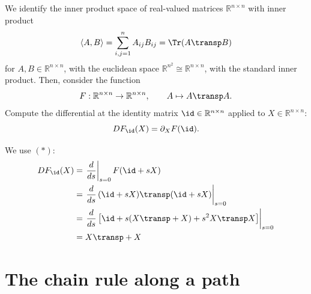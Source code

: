 \begin{center}
\end{center}

\begin{exercise}
\label{ex:transpose_diff}
We identify the inner product space of real-valued matrices $\mathbb{R}^{n\times n}$ with inner
product
\[\langle A, B\rangle = \sum_{i,j=1}^{n} A_{ij}B_{ij} = \Tr(A\transp B)\]
for $A, B \in \mathbb{R}^{n\times n}$, with the euclidean space
$\mathbb{R}^{n^2}\cong\mathbb{R}^{n\times n}$, with the standard inner product. Then, consider
the function
\[F : \mathbb{R}^{n\times n}\to\mathbb{R}^{n\times n}, \qquad A \mapsto A\transp A.\]
Compute the differential at the identity matrix $\id \in \mathbb{R}^{n\times n}$ applied to
$X \in \mathbb{R}^{n\times n}$:
\[DF_{\id}(X) = \partial_X F(\id).\]
\end{exercise}

\begin{exercisesolution}
We use $(*)$:
\[
\begin{aligned}
DF_{\id}(X) &= \left.\frac{d}{ds}\right|_{s=0} F(\id+sX) \\
&= \left.\frac{d}{ds}\,(\id+sX)\transp(\id+sX)\right|_{s=0} \\
&= \left.\frac{d}{ds}\left[\id + s(X\transp+X) + s^2X\transp X\right]\right|_{s=0} \\
&= X\transp + X
\end{aligned}
\]
\end{exercisesolution}


\section{The chain rule along a path}
\label{sec:chain_rule_along_path}

